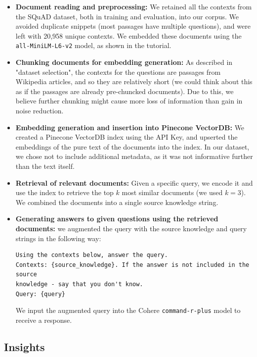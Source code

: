 \documentclass[12pt]{article}
\begin{document}
\begin{itemize}
    \item \textbf{Document reading and preprocessing:} We retained all the contexts from the SQuAD dataset, both in training and evaluation, into our corpus. We avoided duplicate snippets (most passages have multiple questions), and were left with 20,958 unique contexts.
    We embedded these documents using the \texttt{all-MiniLM-L6-v2} model, as shown in the tutorial.
    
    \item \textbf{Chunking documents for embedding generation:} As described in "dataset selection", the contexts for the questions are passages from Wikipedia articles, and so they are relatively short (we could think about this as if the passages are already pre-chuncked documents).
    Due to this, we believe further chunking might cause more loss of information than gain in noise reduction.
    
    \item \textbf{Embedding generation and insertion into Pinecone VectorDB:} We created a Pinecone VectorDB index using the API Key, and upserted the embeddings of the pure text of the documents into the index. 
    In our dataset, we chose not to include additional metadata, as it was not informative further than the text itself.
    
    \item \textbf{Retrieval of relevant documents:} Given a specific query, we encode it and use the index to retrieve the top $k$ most similar documents (we used $k=3$). We combined the documents into a single source knowledge string.

    \item \textbf{Generating answers to given questions using the retrieved documents:} we augmented the query with the source knowledge and query strings in the following way:

\begin{verbatim}
Using the contexts below, answer the query.
Contexts: {source_knowledge}. If the answer is not included in the source 
knowledge - say that you don't know.
Query: {query}
\end{verbatim}

    We input the augmented query into the Cohere \texttt{command-r-plus} model to receive a response.

\end{itemize}

\subsection{Insights}
\end{document}
